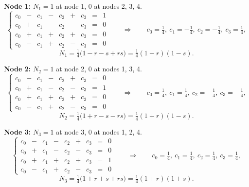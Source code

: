 \documentclass[11pt]{article}
\begin{document}
\medskip
\textbf{Node 1:} $N_{1}=1$ at node 1, $0$ at nodes 2, 3, 4.
\begin{equation}\label{eq:sys1}
\left\{
\begin{alignedat}{5}
  c_{0}&{}-{}&c_{1}&{}-{}&c_{2}&{}+{}&c_{3}&{}={}&1\\
  c_{0}&{}+{}&c_{1}&{}-{}&c_{2}&{}-{}&c_{3}&{}={}&0\\
  c_{0}&{}+{}&c_{1}&{}+{}&c_{2}&{}+{}&c_{3}&{}={}&0\\
  c_{0}&{}-{}&c_{1}&{}+{}&c_{2}&{}-{}&c_{3}&{}={}&0
\end{alignedat}
\right.
\qquad\Longrightarrow\qquad
c_{0}=\tfrac14,\ c_{1}=-\tfrac14,\ c_{2}=-\tfrac14,\ c_{3}=\tfrac14 ,
\end{equation}
\[
  N_{1}=\tfrac14\bigl(1-r-s+rs\bigr)=\tfrac14(1-r)(1-s).
\]

\medskip
\textbf{Node 2:} $N_{2}=1$ at node 2, $0$ at nodes 1, 3, 4.
\begin{equation}\label{eq:sys2}
\left\{
\begin{alignedat}{5}
  c_{0}&{}-{}&c_{1}&{}-{}&c_{2}&{}+{}&c_{3}&{}={}&0\\
  c_{0}&{}+{}&c_{1}&{}-{}&c_{2}&{}-{}&c_{3}&{}={}&1\\
  c_{0}&{}+{}&c_{1}&{}+{}&c_{2}&{}+{}&c_{3}&{}={}&0\\
  c_{0}&{}-{}&c_{1}&{}+{}&c_{2}&{}-{}&c_{3}&{}={}&0
\end{alignedat}
\right.
\qquad\Longrightarrow\qquad
c_{0}=\tfrac14,\ c_{1}=\tfrac14,\ c_{2}=-\tfrac14,\ c_{3}=-\tfrac14 ,
\end{equation}
\[
  N_{2}=\tfrac14\bigl(1+r-s-rs\bigr)=\tfrac14(1+r)(1-s).
\]

\medskip
\textbf{Node 3:} $N_{3}=1$ at node 3, $0$ at nodes 1, 2, 4.
\begin{equation}\label{eq:sys3}
\left\{
\begin{alignedat}{5}
  c_{0}&{}-{}&c_{1}&{}-{}&c_{2}&{}+{}&c_{3}&{}={}&0\\
  c_{0}&{}+{}&c_{1}&{}-{}&c_{2}&{}-{}&c_{3}&{}={}&0\\
  c_{0}&{}+{}&c_{1}&{}+{}&c_{2}&{}+{}&c_{3}&{}={}&1\\
  c_{0}&{}-{}&c_{1}&{}+{}&c_{2}&{}-{}&c_{3}&{}={}&0
\end{alignedat}
\right.
\qquad\Longrightarrow\qquad
c_{0}=\tfrac14,\ c_{1}=\tfrac14,\ c_{2}=\tfrac14,\ c_{3}=\tfrac14 ,
\end{equation}
\[
  N_{3}=\tfrac14\bigl(1+r+s+rs\bigr)=\tfrac14(1+r)(1+s).
\]
\end{document}
